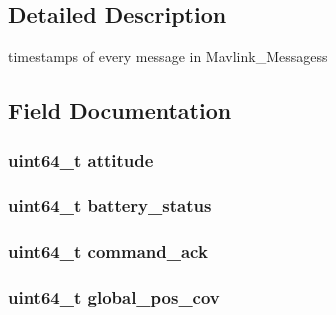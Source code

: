 \subsection{Detailed Description}
timestamps of every message in Mavlink\+\_\+\+Messagess 

\subsection{Field Documentation}
\subsubsection[{\texorpdfstring{attitude}{attitude}}]{\setlength{\rightskip}{0pt plus 5cm}uint64\+\_\+t attitude}\hypertarget{struct_time___stamps_ae5c3610ce264d2ccf7f529ae494ca474}{}\label{struct_time___stamps_ae5c3610ce264d2ccf7f529ae494ca474}
\subsubsection[{\texorpdfstring{battery\+\_\+status}{battery_status}}]{\setlength{\rightskip}{0pt plus 5cm}uint64\+\_\+t battery\+\_\+status}\hypertarget{struct_time___stamps_af6f0cc3b4549bdc74d9f5c3b01522877}{}\label{struct_time___stamps_af6f0cc3b4549bdc74d9f5c3b01522877}
\subsubsection[{\texorpdfstring{command\+\_\+ack}{command_ack}}]{\setlength{\rightskip}{0pt plus 5cm}uint64\+\_\+t command\+\_\+ack}\hypertarget{struct_time___stamps_aa52d5737fe1f692528b7ff03154399ea}{}\label{struct_time___stamps_aa52d5737fe1f692528b7ff03154399ea}
\subsubsection[{\texorpdfstring{global\+\_\+pos\+\_\+cov}{global_pos_cov}}]{\setlength{\rightskip}{0pt plus 5cm}uint64\+\_\+t global\+\_\+pos\+\_\+cov}\hypertarget{struct_time___stamps_a2e1be3841e043dd003c6d09b1d2fd6c0}{}\label{struct_time___stamps_a2e1be3841e043dd003c6d09b1d2fd6c0}
